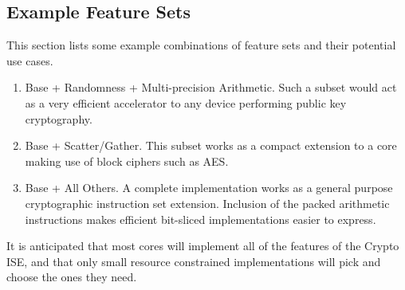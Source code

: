 \subsection{Example Feature Sets}

This section lists some example combinations of feature sets and their
potential use cases.

\begin{enumerate}
\item Base + Randomness + Multi-precision Arithmetic. Such a subset would
    act as a very efficient accelerator to any device performing public
    key cryptography.
\item Base + Scatter/Gather. This subset works as a compact extension to
    a core making use of block ciphers such as AES.
\item Base + All Others. A complete implementation works as a general
    purpose cryptographic instruction set extension. Inclusion of the
    packed arithmetic instructions makes efficient bit-sliced implementations
    easier to express.
\end{enumerate}

It is anticipated that most cores will implement all of the features of the
Crypto ISE, and that only small resource constrained implementations will
pick and choose the ones they need.
